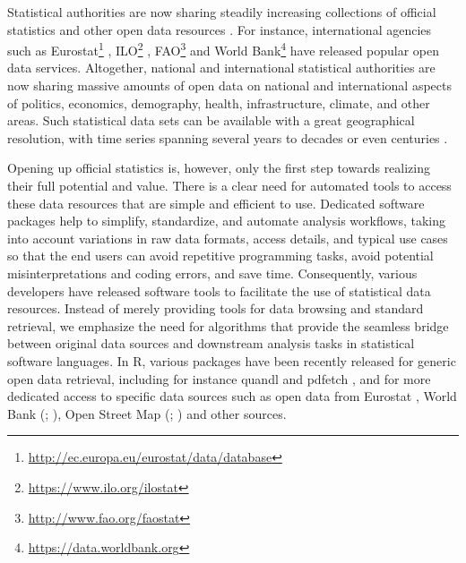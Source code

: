 
Statistical authorities are now sharing steadily increasing
collections of official statistics and other open data
resources \cite{xxx}. For instance, international agencies such as
Eurostat\footnote{\url{http://ec.europa.eu/eurostat/data/database}} \cite{xxx},
ILO\footnote{\url{https://www.ilo.org/ilostat}} \cite{xxx} ,
FAO\footnote{\url{http://www.fao.org/faostat}} \cite{xxx} and World
Bank\footnote{\url{https://data.worldbank.org}} \cite{xxx} have
released popular open data services. Altogether, national and
international statistical authorities are now sharing massive amounts
of open data on national and international aspects of politics,
economics, demography, health, infrastructure, climate, and other
areas. Such statistical data sets can be available with a great
geographical resolution, with time series spanning several years to
decades or even centuries \cite{xxx}.


Opening up official statistics is, however, only the first step
towards realizing their full potential and value. There is a clear
need for automated tools to access these data resources that are
simple and efficient to use. Dedicated software packages help to
simplify, standardize, and automate analysis workflows, taking into
account variations in raw data formats, access details, and typical
use cases so that the end users can avoid repetitive programming
tasks, avoid potential misinterpretations and coding errors, and save
time. Consequently, various developers have released software tools to
facilitate the use of statistical data resources. Instead of merely
providing tools for data browsing and standard retrieval, we emphasize
the need for algorithms that provide the seamless bridge between
original data sources and downstream analysis tasks in statistical
software languages. In R, various packages have been recently released
for generic open data retrieval, including for instance
quandl \cite{quandl} and pdfetch \cite{pdfetch}, and for more
dedicated access to specific data sources such as open data from
Eurostat \cite{Lahti17eurostat}, World Bank
(; \citealt{WDI}), Open Street Map
(; \citealt{osmar}) and other sources.


